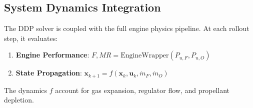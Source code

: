 \subsection{System Dynamics Integration}
The DDP solver is coupled with the full engine physics pipeline. At each rollout step, it evaluates:
\begin{enumerate}
    \item \textbf{Engine Performance}: $F, MR = \text{EngineWrapper}(P_{u,F}, P_{u,O})$
    \item \textbf{State Propagation}: $\mathbf{x}_{k+1} = f(\mathbf{x}_k, \mathbf{u}_k, \dot{m}_F, \dot{m}_O)$
\end{enumerate}
The dynamics $f$ account for gas expansion, regulator flow, and propellant depletion.
